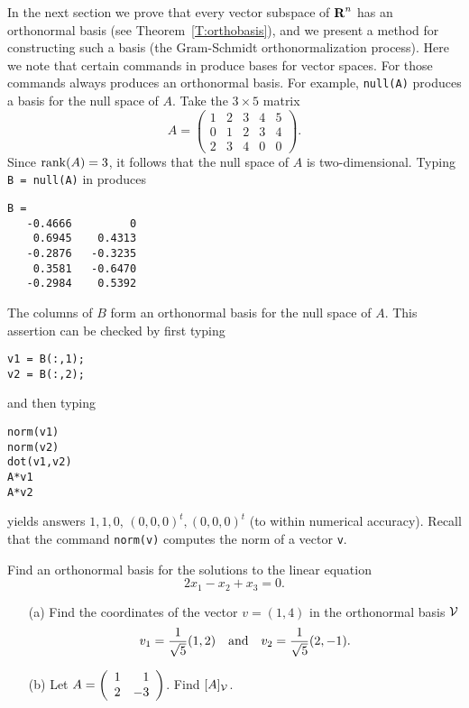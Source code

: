 In the next section we prove that every vector subspace of $\mbox{$\bf{R}$}^n$ has an
orthonormal basis (see Theorem~\ref{T:orthobasis}), and we present a method
for constructing such a basis (the Gram-Schmidt orthonormalization process).
Here we note that certain commands in \Matlab produce bases for vector spaces.
For those commands \Matlab always produces an orthonormal basis.  For example,
{\tt null(A)} produces a basis for the null space
 of $A$.  Take the $3\times 5$ matrix
\begin{equation*}
\label{eq:Anull1}
A = \left(\begin{array}{rrrrr} 1 & 2 & 3 & 4 & 5\\ 0 & 1 & 2 & 3 & 4\\
2 & 3 & 4 & 0 & 0 \end{array}\right).
\end{equation*}
Since ${\rm rank}(A)=3$, it follows that the null space of $A$ is two-dimensional.
Typing {\tt B = null(A)} in \Matlab produces
\begin{verbatim}
B =
   -0.4666         0
    0.6945    0.4313
   -0.2876   -0.3235
    0.3581   -0.6470
   -0.2984    0.5392
\end{verbatim}
The columns of $B$ form an orthonormal basis for the null space of $A$.
This assertion can be checked by first typing
\begin{verbatim}
v1 = B(:,1);
v2 = B(:,2);
\end{verbatim}
and then typing
\begin{verbatim}
norm(v1)
norm(v2)
dot(v1,v2)
A*v1
A*v2
\end{verbatim}
yields answers $1,1,0$, $(0,0,0)^t,(0,0,0)^t$
(to within numerical accuracy).  Recall that the \Matlab
command {\tt norm(v)} computes the norm of a vector {\tt v}.





\EXER

\TEXER

\begin{exercise} \label{c7.4.1}
Find an orthonormal basis for the solutions to the linear equation
\[
2x_1-x_2+x_3=0.
\]
\end{exercise}

\begin{exercise} \label{c7.4.2}
\begin{itemize}
\item[(a)] Find the coordinates of the vector $v=(1,4)$ in the orthonormal
basis ${\cal V}$
\[
v_1 = \frac{1}{\sqrt{5}}(1,2) \quad\mbox{and}\quad v_2 = \frac{1}{\sqrt{5}}(2,-1).
\]
\item[(b)]  Let $A=\left(\begin{array}{rr} 1 & 1\\ 2 &-3\end{array}\right)$. Find $[A]_{\cal V}$.
\end{itemize}
\end{exercise}




